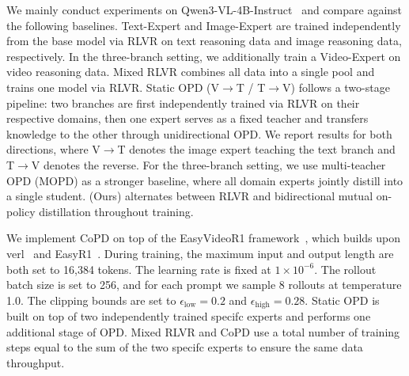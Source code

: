  We mainly conduct experiments on Qwen3-VL-4B-Instruct~\cite{bai2025qwen3vltechnicalreport} and compare \method against the following baselines. Text-Expert and Image-Expert are trained independently from the base model via RLVR on text reasoning data and image reasoning data, respectively. In the three-branch setting, we additionally train a Video-Expert on video reasoning data. Mixed 
RLVR combines all data into a single pool and trains one model via RLVR. Static OPD (V$\to$T / T$\to$V) follows a two-stage pipeline: two branches are first independently trained via RLVR on their respective domains, then one expert serves as a fixed teacher and transfers knowledge to the other through unidirectional OPD. We report results for both directions, where V$\to$T denotes the image expert teaching the text branch and T$\to$V denotes the reverse. For the three-branch setting, we use multi-teacher OPD (MOPD) as a stronger baseline, where all domain experts jointly distill into a single student. \method (Ours) alternates between RLVR and bidirectional mutual on-policy distillation throughout training.

 We implement CoPD on top of the EasyVideoR1 framework~\cite{qin2026easyvideor1easierrlvideo}, which builds upon verl~\cite{sheng2024hybridflow} and EasyR1~\cite{zheng2025easyr1}. During training, the maximum input and output length are both set to 16,384 tokens. The learning rate is fixed at $1 \times 10^{-6}$. The rollout batch size is set to 256, and for each prompt we sample 8 rollouts at temperature 1.0. The clipping bounds are set to $\epsilon_{\text{low}} = 0.2$ and $\epsilon_{\text{high}} = 0.28$. Static OPD is built on top of two independently trained specifc experts and performs one additional stage of OPD. Mixed RLVR and CoPD use a total number of training steps equal to the sum of the two specifc experts to ensure the same data throughput. 

